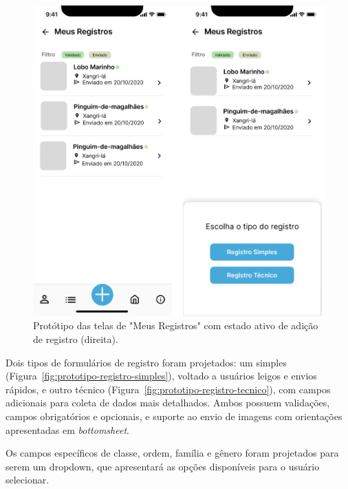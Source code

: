 \begin{figure}[H]
    \centering
    \includegraphics[height=0.6\textheight]{imagens/meus-registros-figma.png}
    \caption{Protótipo das telas de "Meus Registros" com estado ativo de adição de registro (direita).}
    \label{fig:prototipo-meus-registros}
\end{figure}

Dois tipos de formulários de registro foram projetados: um simples
 (Figura~\ref{fig:prototipo-registro-simples}), voltado a usuários leigos e envios rápidos, e 
 outro técnico (Figura~\ref{fig:prototipo-registro-tecnico}), com campos adicionais 
 para coleta de dados mais detalhados. Ambos possuem validações, campos obrigatórios e 
 opcionais, e suporte ao envio de imagens com orientações apresentadas em \textit{bottomsheet}.

Os campos específicos de classe, ordem, família e gênero foram projetados para serem um dropdown,
que apresentará as opções disponíveis para o usuário selecionar.

